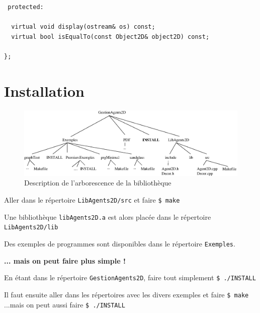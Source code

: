 \documentclass[12pt]{article}
\begin{document}
\begin{small}
\begin{verbatim}
 protected:

  virtual void display(ostream& os) const;
  virtual bool isEqualTo(const Object2D& object2D) const;

};
\end{verbatim}
\end{small}

\newpage

\section{Installation}

\vspace{-0.5cm}
\begin{figure}[hbtp]
\begin{center}
\includegraphics[width=15.5cm]{fig/arbo}
\end{center}
\caption{Description de l'arborescence de la biblioth\`eque}
\end{figure}

Aller dans le r\'epertoire {\tt LibAgents2D/src}
et faire {\tt \$ make}

Une biblioth\`eque {\tt libAgents2D.a} est alors plac\'ee dans le r\'epertoire
{\tt LibAgents2D/lib}

Des exemples de programmes sont disponibles dans le r\'epertoire
{\tt Exemples}.

\vspace{0.5cm}
{\bf ... mais on peut faire plus simple !}

\vspace{0.3cm}

En \'etant dans le r\'epertoire {\tt GestionAgents2D}, faire tout
simplement {\tt \$ ./INSTALL}

Il faut ensuite aller dans les r\'epertoires avec les divers exemples
et faire {\tt \$ make}\\
...mais on peut aussi faire {\tt \$ ./INSTALL}
\end{document}

